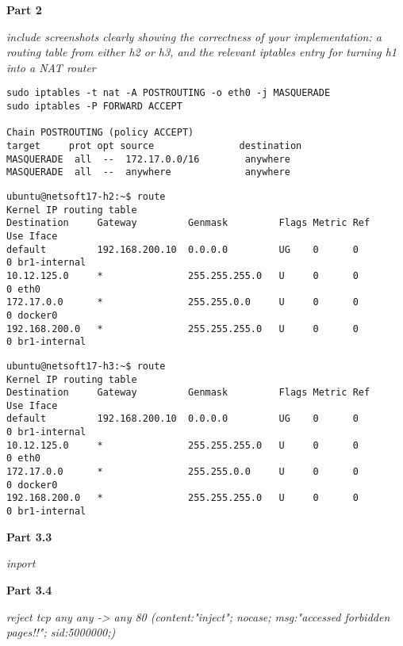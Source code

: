 \documentclass[12pt]{article}
\begin{document}
\vspace{5mm} 
\textbf{Part 2}

\vspace{2mm} 
\textit{include screenshots clearly showing the correctness of your implementation: 
	a routing table from either h2 or h3, and the relevant iptables entry for
	turning h1 into a NAT router}
\vspace{2mm} 

\begin{verbatim}
sudo iptables -t nat -A POSTROUTING -o eth0 -j MASQUERADE
sudo iptables -P FORWARD ACCEPT

Chain POSTROUTING (policy ACCEPT)
target     prot opt source               destination
MASQUERADE  all  --  172.17.0.0/16        anywhere
MASQUERADE  all  --  anywhere             anywhere
\end{verbatim}

\begin{verbatim}
ubuntu@netsoft17-h2:~$ route
Kernel IP routing table
Destination     Gateway         Genmask         Flags Metric Ref    Use Iface
default         192.168.200.10  0.0.0.0         UG    0      0        0 br1-internal
10.12.125.0     *               255.255.255.0   U     0      0        0 eth0
172.17.0.0      *               255.255.0.0     U     0      0        0 docker0
192.168.200.0   *               255.255.255.0   U     0      0        0 br1-internal
\end{verbatim}

\begin{verbatim}
ubuntu@netsoft17-h3:~$ route
Kernel IP routing table
Destination     Gateway         Genmask         Flags Metric Ref    Use Iface
default         192.168.200.10  0.0.0.0         UG    0      0        0 br1-internal
10.12.125.0     *               255.255.255.0   U     0      0        0 eth0
172.17.0.0      *               255.255.0.0     U     0      0        0 docker0
192.168.200.0   *               255.255.255.0   U     0      0        0 br1-internal
\end{verbatim}

\vspace{5mm} 
\textbf{Part 3.3}

\vspace{2mm} 
\textit{inport}
\vspace{2mm} 

\textbf{Part 3.4}

\vspace{2mm} 
\textit{reject tcp any any -> any 80 (content:"inject"; nocase; msg:"accessed forbidden pages!!"; sid:5000000;)}
\vspace{2mm} 
\end{document}
